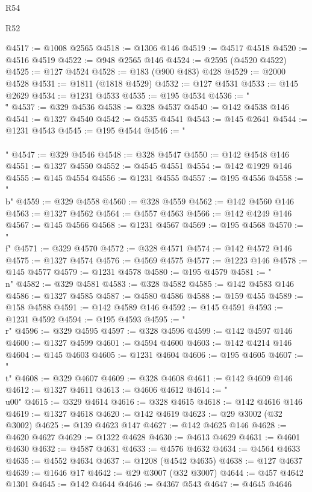 \begin{lexlean}{R54}
\begin{lexlean}{R52}
\begin{coremodule}
{{{{{{{{{{{{{{{{{{{{{{{{{{{{{{{{{{{{{{{{{{{{{{{{{{{{{{{{{{{{{{{{{{{{{{{{{{{{{{{{{{{{{{{{{{{{{{{{{{{{{{{{{{{{{{{{{{{{{{{{{{{{{{{{{{{{{{{{{{{{{{{{{{{{{{{{{{{{{{{{{{{{{{{{{{{{{{{{{{{{{{{{{{{{{{{{{{{{{{@4517 := @1008 @2565
@4518 := @1306 @146
@4519 := @4517 @4518
@4520 := @4516 @4519
@4522 := @948 @2565 @146
@4524 := @2595 (@4520 @4522)
@4525 := @127 @4524
@4528 := @183 (@900 @483) @428
@4529 := @2000 @4528
@4531 := @1811 (@1818 @4529)
@4532 := @127 @4531
@4533 := @145 @2629
@4534 := @1231 @4533
@4535 := @195 @4534
@4536 := "\\\""
@4537 := @329 @4536
@4538 := @328 @4537
@4540 := @142 @4538 @146
@4541 := @1327 @4540
@4542 := @4535 @4541
@4543 := @145 @2641
@4544 := @1231 @4543
@4545 := @195 @4544
@4546 := "\\\\"
@4547 := @329 @4546
@4548 := @328 @4547
@4550 := @142 @4548 @146
@4551 := @1327 @4550
@4552 := @4545 @4551
@4554 := @142 @1929 @146
@4555 := @145 @4554
@4556 := @1231 @4555
@4557 := @195 @4556
@4558 := "\\b"
@4559 := @329 @4558
@4560 := @328 @4559
@4562 := @142 @4560 @146
@4563 := @1327 @4562
@4564 := @4557 @4563
@4566 := @142 @4249 @146
@4567 := @145 @4566
@4568 := @1231 @4567
@4569 := @195 @4568
@4570 := "\\f"
@4571 := @329 @4570
@4572 := @328 @4571
@4574 := @142 @4572 @146
@4575 := @1327 @4574
@4576 := @4569 @4575
@4577 := @1223 @146
@4578 := @145 @4577
@4579 := @1231 @4578
@4580 := @195 @4579
@4581 := "\\n"
@4582 := @329 @4581
@4583 := @328 @4582
@4585 := @142 @4583 @146
@4586 := @1327 @4585
@4587 := @4580 @4586
@4588 := @159 @455
@4589 := @158 @4588
@4591 := @142 @4589 @146
@4592 := @145 @4591
@4593 := @1231 @4592
@4594 := @195 @4593
@4595 := "\\r"
@4596 := @329 @4595
@4597 := @328 @4596
@4599 := @142 @4597 @146
@4600 := @1327 @4599
@4601 := @4594 @4600
@4603 := @142 @4214 @146
@4604 := @145 @4603
@4605 := @1231 @4604
@4606 := @195 @4605
@4607 := "\\t"
@4608 := @329 @4607
@4609 := @328 @4608
@4611 := @142 @4609 @146
@4612 := @1327 @4611
@4613 := @4606 @4612
@4614 := "\\u00"
@4615 := @329 @4614
@4616 := @328 @4615
@4618 := @142 @4616 @146
@4619 := @1327 @4618
@4620 := @142 @4619
@4623 := @29 @3002 (@32 @3002)
@4625 := @139 @4623 @147
@4627 := @142 @4625 @146
@4628 := @4620 @4627
@4629 := @1322 @4628
@4630 := @4613 @4629
@4631 := @4601 @4630
@4632 := @4587 @4631
@4633 := @4576 @4632
@4634 := @4564 @4633
@4635 := @4552 @4634
@4637 := @1208 (@4542 @4635)
@4638 := @127 @4637
@4639 := @1646 @17
@4642 := @29 @3007 (@32 @3007)
@4644 := @457 @4642 @1301
@4645 := @142 @4644
@4646 := @4367 @543
@4647 := @4645 @4646
}}}}}}}}}}}}}}}}}}}}}}}}}}}}}}}}}}}}}}}}}}}}}}}}}}}}}}}}}}}}}}}}}}}}}}}}}}}}}}}}}}}}}}}}}}}}}}}}}}}}}}}}}}}}}}}}}}}}}}}}}}}}}}}}}}}}}}}}}}}}}}}}}}}}}}}}}}}}}}}}}}}}}}}}}}}}}}}}}}}}}}}}}}}}}}}}}}}}}}
\end{coremodule}
\end{lexlean}
\end{lexlean}
